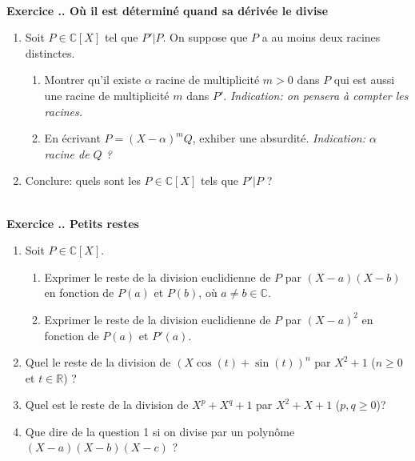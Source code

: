 \documentclass{article}
\newcommand{\mb}[1]{\mathbb{#1}}
\newcounter{exo}
\newcommand{\exercice}[1][\null]{\textbf{\\ Exercice \thesection.\theexo. #1} \addtocounter{exo}{1}}
\begin{document}
\exercice[Où il est déterminé quand sa dérivée le divise]


\begin{enumerate}

\item Soit $P \in \mb{C}[X]$ tel que $P' | P$. On suppose que $P$ a au moins deux racines distinctes.

\begin{enumerate}

\item Montrer qu'il existe $\alpha$ racine de multiplicité $m>0$ dans $P$  qui est aussi une racine de multiplicité $m$ dans $P'$. \emph{Indication: on pensera à compter les racines.}

\item En écrivant $P = (X - \alpha)^m Q$, exhiber une absurdité. \emph{Indication: $\alpha$ racine de $Q$ ?}

\end{enumerate}

\item Conclure: quels sont les $P \in \mb{C}[X]$ tels que $P' | P$ ?


\end{enumerate}


\exercice[Petits restes]

\begin{enumerate}

\item Soit $P \in \mb{C}[X]$.

\begin{enumerate}

\item Exprimer le reste de la division euclidienne de $P$ par $(X-a)(X-b)$ en fonction de $P(a)$ et $P(b)$, où $a \neq b \in \mb{C}$. 

\item Exprimer le reste de la division euclidienne de $P$ par $(X-a)^2$ en fonction de $P(a)$ et $P'(a)$. 

\end{enumerate}

\item Quel le reste de la division de $(X \cos(t) + \sin(t))^n$ par $X^2+1$ ($n \ge 0$ et $t \in \mb{R}$) ?

\item Quel est le reste de la division de $X^p + X^q + 1$ par $X^2 + X + 1$ ($p,q \ge 0$)?

\item Que dire de la question 1 si on divise par un polynôme $(X-a)(X-b)(X-c)$ ?

\end{enumerate}
\end{document}
